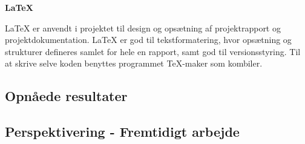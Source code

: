 \textbf{LaTeX}

LaTeX er anvendt i projektet til design og opsætning af projektrapport og projektdokumentation. LaTeX er god til tekstformatering, hvor opsætning og strukturer defineres samlet for hele en rapport, samt god til versionsstyring. Til at skrive selve koden benyttes programmet TeX-maker som kombiler. 

\subsection{Opnåede resultater}
\subsection{Perspektivering - Fremtidigt arbejde}